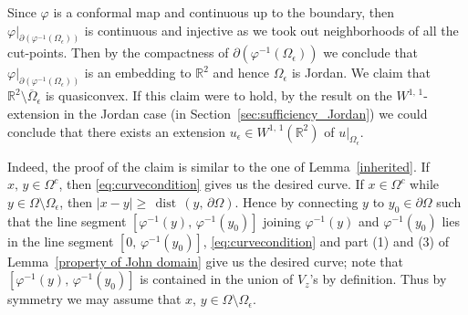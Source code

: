 \documentclass[reqno,11pt]{amsart}
\def\rr{{\mathbb R}}
\def\dist{{\mathop\mathrm{\,dist\,}}}
\def\ez{\epsilon}
\numberwithin{equation}{section}
\theoremstyle{remark}
\begin{document}
% 







Since $\varphi$ is a conformal map and continuous up to the boundary, then $\varphi|_{\partial  (\varphi^{-1}(\Omega_\epsilon))}$ is continuous and injective as we took out neighborhoods of all the cut-points. Then by the compactness of $\partial  (\varphi^{-1}(\Omega_\epsilon))$ we conclude that $\varphi|_{\partial ( \varphi^{-1}(\Omega_\epsilon))}$ is an embedding to $\mathbb R^2$ and hence
$\Omega_\epsilon$ is Jordan. 
We claim that $\mathbb R^2\setminus \overline{\Omega}_\ez$ is  quasiconvex.  If this claim were to hold, by the result on the $W^{1,\,1}$-extension in the Jordan case (in Section~\ref{sec:sufficiency_Jordan}) we could conclude that there exists an extension 
$u_\epsilon \in W^{1,\,1}(\rr^2)$ of $u|_{\Omega_\epsilon}$. 


Indeed, the proof of the claim is similar to the one of Lemma~\ref{inherited}. If $x,\,y\in \Omega^c$, then \eqref{eq:curvecondition} gives us the desired curve. If $x\in \Omega^c$
 while $y\in \Omega\setminus \Omega_\ez$, then $|x-y|\ge \dist(y,\,\partial \Omega)$. Hence by connecting $y$ to $y_0\in \partial \Omega$ such that  the line segment $[\varphi^{-1}(y),\,\varphi^{-1}(y_0)]$ joining $\varphi^{-1}(y)$ and $\varphi^{-1}(y_0)$ lies in the line segment $[0,\,\varphi^{-1}(y_0)]$, \eqref{eq:curvecondition} and part (1) and (3) of Lemma~\ref{property of John domain}  give us the desired curve; note that $[\varphi^{-1}(y),\,\varphi^{-1}(y_0)]$ is contained in the union of $V_z$'s by definition. Thus by symmetry we may assume that $x,\,y\in \Omega\setminus \Omega_\ez$.
 
\end{document}
